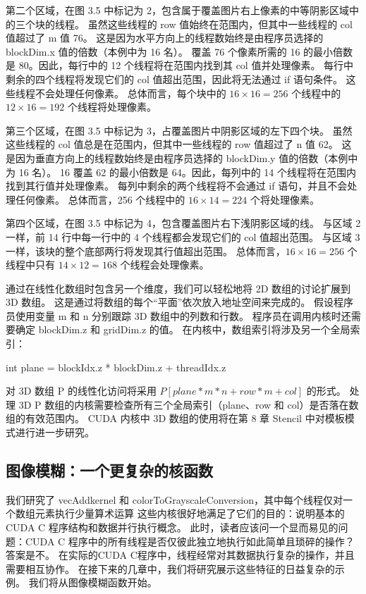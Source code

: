 第二个区域，在图 3.5 中标记为 2，包含属于覆盖图片右上像素的中等阴影区域中的三个块的线程。 
虽然这些线程的 row 值始终在范围内，但其中一些线程的 col 值超过了 m 值 76。
这是因为水平方向上的线程数始终是由程序员选择的 blockDim.x 值的倍数（本例中为 16 名）。 
覆盖 76 个像素所需的 16 的最小倍数是 80。因此，每行中的 12 个线程将在范围内找到其 col 值并处理像素。 
每行中剩余的四个线程将发现它们的 col 值超出范围，因此将无法通过 if 语句条件。 这些线程不会处理任何像素。 
总体而言，每个块中的 $16 \times 16 = 256$ 个线程中的 $12 \times 16 = 192$ 个线程将处理像素。

第三个区域，在图 3.5 中标记为 3，占覆盖图片中阴影区域的左下四个块。 
虽然这些线程的 col 值总是在范围内，但其中一些线程的 row 值超过了 n 值 62。
这是因为垂直方向上的线程数始终是由程序员选择的 blockDim.y 值的倍数（本例中为 16 名）。 
16 覆盖 62 的最小倍数是 64。因此，每列中的 14 个线程将在范围内找到其行值并处理像素。 
每列中剩余的两个线程将不会通过 if 语句，并且不会处理任何像素。 
总体而言，256 个线程中的 $16 \times 14 = 224$ 个将处理像素。

第四个区域，在图 3.5 中标记为 4，包含覆盖图片右下浅阴影区域的线。 
与区域 2 一样，前 14 行中每一行中的 4 个线程都会发现它们的 col 值超出范围。 
与区域 3 一样，该块的整个底部两行将发现其行值超出范围。 
总体而言，$16 \times 16 = 256$ 个线程中只有 $14 \times 12 = 168$ 个线程会处理像素。

通过在线性化数组时包含另一个维度，我们可以轻松地将 2D 数组的讨论扩展到 3D 数组。 
这是通过将数组的每个“平面”依次放入地址空间来完成的。 假设程序员使用变量 m 和 n 分别跟踪 3D 数组中的列数和行数。 
程序员在调用内核时还需要确定 blockDim.z 和 gridDim.z 的值。 在内核中，数组索引将涉及另一个全局索引：

int plane = blockIdx.z * blockDim.z + threadIdx.z

对 3D 数组 P 的线性化访问将采用 $P[plane * m * n +row * m+col]$ 的形式。 
处理 3D P 数组的内核需要检查所有三个全局索引（plane、row 和 col）是否落在数组的有效范围内。 
CUDA 内核中 3D 数组的使用将在第 8 章 Stencil 中对模板模式进行进一步研究。

\subsection{图像模糊：一个更复杂的核函数}
我们研究了 vecAddkernel 和 colorToGrayscaleConversion，其中每个线程仅对一个数组元素执行少量算术运算
这些内核很好地满足了它们的目的：说明基本的 CUDA C 程序结构和数据并行执行概念。 
此时，读者应该问一个显而易见的问题：CUDA C 程序中的所有线程是否仅彼此独立地执行如此简单且琐碎的操作？ 答案是不。 
在实际的CUDA C程序中，线程经常对其数据执行复杂的操作，并且需要相互协作。 
在接下来的几章中，我们将研究展示这些特征的日益复杂的示例。 我们将从图像模糊函数开始。

